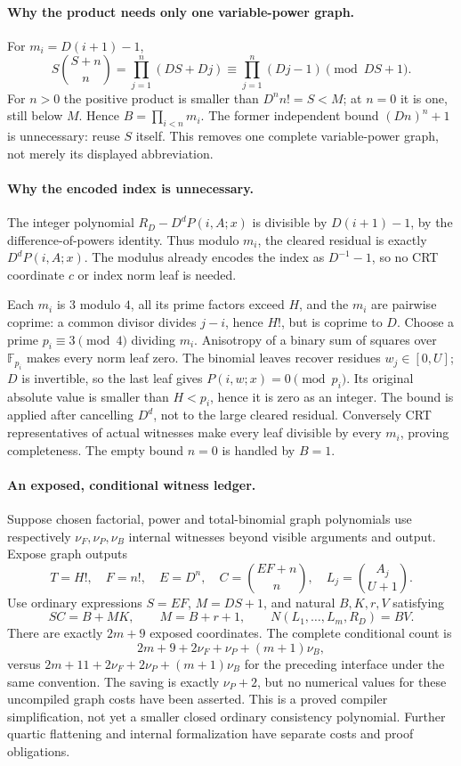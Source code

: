 \paragraph{Why the product needs only one variable-power graph.}
For $m_i=D(i+1)-1$,
\[
 S\binom{S+n}{n}=\prod_{j=1}^n(DS+Dj)
 \equiv\prod_{j=1}^n(Dj-1)\pmod{DS+1}.
\]
For $n>0$ the positive product is smaller than $D^n n!=S<M$; at $n=0$
it is one, still below $M$.  Hence $B=\prod_{i<n}m_i$.  The former
independent bound $(Dn)^n+1$ is unnecessary: reuse $S$ itself.  This removes
one complete variable-power graph, not merely its displayed abbreviation.

\paragraph{Why the encoded index is unnecessary.}
The integer polynomial $R_D-D^dP(i,A;x)$ is divisible by $D(i+1)-1$,
by the difference-of-powers identity.  Thus modulo $m_i$, the cleared
residual is exactly $D^dP(i,A;x)$.  The modulus already encodes the index
as $D^{-1}-1$, so no CRT coordinate $c$ or index norm leaf is needed.

Each $m_i$ is $3$ modulo $4$, all its prime factors exceed $H$, and the
$m_i$ are pairwise coprime: a common divisor divides $j-i$, hence $H!$,
but is coprime to $D$.  Choose a prime $p_i\equiv3\pmod4$ dividing $m_i$.
Anisotropy of a binary sum of squares over $\mathbb F_{p_i}$ makes every
norm leaf zero.  The binomial leaves recover residues $w_j\in[0,U]$;
$D$ is invertible, so the last leaf gives $P(i,w;x)=0\pmod{p_i}$.
Its original absolute value is smaller than $H<p_i$, hence it is zero
as an integer.  The bound is applied after cancelling $D^d$, not to the
large cleared residual.  Conversely CRT representatives of actual witnesses
make every leaf divisible by every $m_i$, proving completeness.  The empty
bound $n=0$ is handled by $B=1$.

\paragraph{An exposed, conditional witness ledger.}
Suppose chosen factorial, power and total-binomial graph polynomials use
respectively $\nu_F,\nu_P,\nu_B$ internal witnesses beyond visible arguments
and output.  Expose graph outputs
\[
 T=H!,\quad F=n!,\quad E=D^n,\quad C=\binom{EF+n}{n},\quad
 L_j=\binom{A_j}{U+1}.
\]
Use ordinary expressions $S=EF$, $M=DS+1$, and natural $B,K,r,V$ satisfying
\[
 SC=B+MK,\qquad M=B+r+1,\qquad N(L_1,\ldots,L_m,R_D)=BV.
\]
There are exactly $2m+9$ exposed coordinates.  The complete conditional
count is
\[
 2m+9+2\nu_F+\nu_P+(m+1)\nu_B,
\]
versus $2m+11+2\nu_F+2\nu_P+(m+1)\nu_B$ for the preceding interface
under the same convention.  The saving is exactly $\nu_P+2$, but no
numerical values for these uncompiled graph costs have been asserted.
This is a proved compiler simplification, not yet a smaller closed ordinary
consistency polynomial.  Further quartic flattening and internal formalization
have separate costs and proof obligations.

